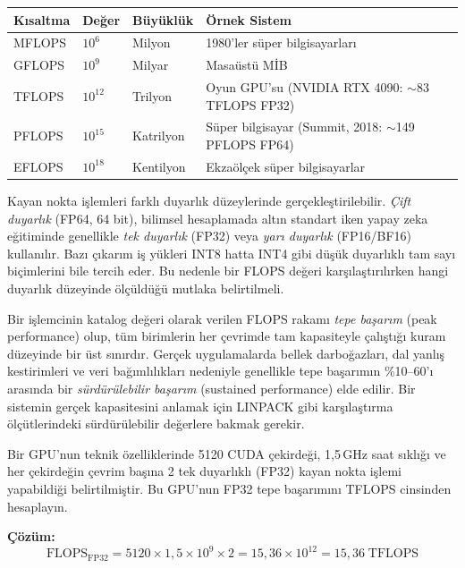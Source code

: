 \begin{center}
\small
\begin{tabular}{llll}
\toprule
\textbf{Kısaltma} & \textbf{Değer} & \textbf{Büyüklük} & \textbf{Örnek Sistem} \\
\midrule
MFLOPS  & $10^{6}$  & Milyon    & 1980'ler süper bilgisayarları \\
GFLOPS\index{GFLOPS}  & $10^{9}$  & Milyar    & Masaüstü MİB \\
TFLOPS\index{TFLOPS}  & $10^{12}$ & Trilyon   & Oyun GPU'su (NVIDIA RTX 4090: $\sim$83 TFLOPS FP32) \\
PFLOPS\index{PFLOPS}  & $10^{15}$ & Katrilyon & Süper bilgisayar (Summit, 2018: $\sim$149 PFLOPS FP64) \\
EFLOPS\index{EFLOPS}  & $10^{18}$ & Kentilyon & Ekzaölçek süper bilgisayarlar \\
\bottomrule
\end{tabular}
\end{center}

Kayan nokta işlemleri farklı duyarlık düzeylerinde gerçekleştirilebilir. \emph{Çift duyarlık} (FP64, 64 bit), bilimsel hesaplamada altın standart iken yapay zeka eğitiminde genellikle \emph{tek duyarlık} (FP32) veya \emph{yarı duyarlık} (FP16/BF16) kullanılır. Bazı çıkarım iş yükleri INT8 hatta INT4 gibi düşük duyarlıklı tam sayı biçimlerini bile tercih eder. Bu nedenle bir FLOPS değeri karşılaştırılırken hangi duyarlık düzeyinde ölçüldüğü mutlaka belirtilmeli.

\begin{bilginot}
Bir işlemcinin katalog değeri olarak verilen FLOPS rakamı \emph{tepe başarım} (peak performance) olup, tüm birimlerin her çevrimde tam kapasiteyle çalıştığı kuram düzeyinde bir üst sınırdır. Gerçek uygulamalarda bellek darboğazları, dal yanlış kestirimleri ve veri bağımlılıkları nedeniyle genellikle tepe başarımın \%10--60'ı arasında bir \emph{sürdürülebilir başarım} (sustained performance) elde edilir. Bir sistemin gerçek kapasitesini anlamak için LINPACK gibi karşılaştırma ölçütlerindeki sürdürülebilir değerlere bakmak gerekir.
\end{bilginot}

\begin{ornek}[2.6]
Bir GPU'nun teknik özelliklerinde 5120 CUDA çekirdeği, 1,5\,GHz saat sıklığı ve her çekirdeğin çevrim başına 2 tek duyarlıklı (FP32) kayan nokta işlemi yapabildiği belirtilmiştir. Bu GPU'nun FP32 tepe başarımını TFLOPS cinsinden hesaplayın.

\textbf{Çözüm:}
\[
\text{FLOPS}_{\text{FP32}} = 5120 \times 1{,}5 \times 10^9 \times 2 = 15{,}36 \times 10^{12} = 15{,}36 \; \text{TFLOPS}
\]
\end{ornek}

